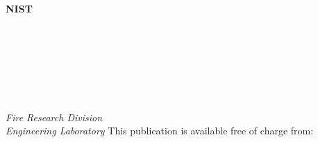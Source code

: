 \begin{titlepage}
\begin{flushright}
\LARGE{{\textbf{NIST \pubseries}}}\\
\LARGE{{\textbf{\pubnumber}}}\\
\vfill
\Huge{{\textbf{\pubtitle}}}\\
\Large{{\textit{\pubsubtitle}}}\\
\vfill
\normalsize
\authorone\\
\authortwo\\
\authorthree\\
\authorfour\\
\textit{Fire Research Division}\\
\textit{Engineering Laboratory}
\vfill
\normalsize This publication is available free of charge from:\\
\DOI\\
\vfill
\normalsize \pubmonth~\pubyear\\
\vfill


\end{flushright}
\end{titlepage}
